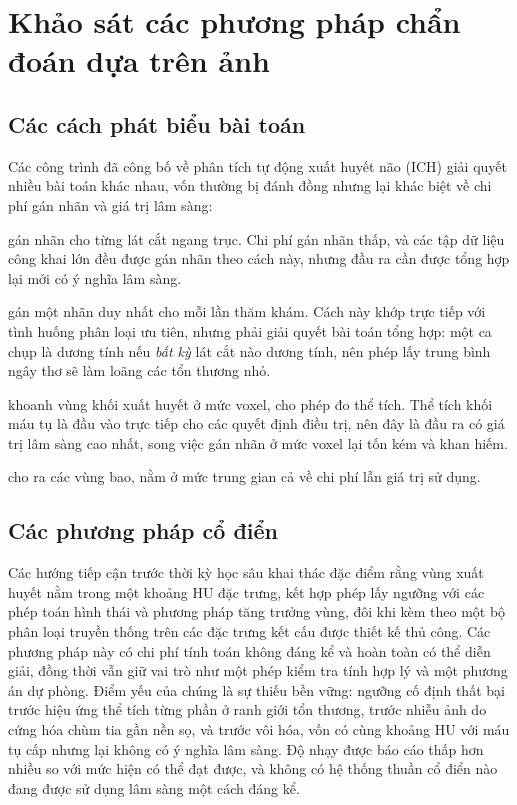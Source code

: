 \section{Khảo sát các phương pháp chẩn đoán dựa trên ảnh}
\label{sec:methods}

\subsection{Các cách phát biểu bài toán}

Các công trình đã công bố về phân tích tự động xuất huyết não (ICH) giải quyết
nhiều bài toán khác nhau, vốn thường bị đánh đồng nhưng lại khác biệt về chi phí
gán nhãn và giá trị lâm sàng:

\begin{description}[leftmargin=2.6cm,style=nextline]
    \item[Phân loại lát cắt] gán nhãn cho từng lát cắt ngang trục. Chi phí gán
          nhãn thấp, và các tập dữ liệu công khai lớn đều được gán nhãn theo cách
          này, nhưng đầu ra cần được tổng hợp lại mới có ý nghĩa lâm sàng.
    \item[Phân loại ca chụp] gán một nhãn duy nhất cho mỗi lần thăm khám. Cách
          này khớp trực tiếp với tình huống phân loại ưu tiên, nhưng phải giải
          quyết bài toán tổng hợp: một ca chụp là dương tính nếu \emph{bất kỳ}
          lát cắt nào dương tính, nên phép lấy trung bình ngây thơ sẽ làm loãng
          các tổn thương nhỏ.
    \item[Phân vùng] khoanh vùng khối xuất huyết ở mức voxel, cho phép đo thể
          tích. Thể tích khối máu tụ là đầu vào trực tiếp cho các quyết định điều
          trị, nên đây là đầu ra có giá trị lâm sàng cao nhất, song việc gán nhãn
          ở mức voxel lại tốn kém và khan hiếm.
    \item[Phát hiện / định vị] cho ra các vùng bao, nằm ở mức trung gian cả về
          chi phí lẫn giá trị sử dụng.
\end{description}

\subsection{Các phương pháp cổ điển}

Các hướng tiếp cận trước thời kỳ học sâu khai thác đặc điểm rằng vùng xuất huyết
nằm trong một khoảng HU đặc trưng, kết hợp phép lấy ngưỡng với các phép toán hình
thái và phương pháp tăng trưởng vùng, đôi khi kèm theo một bộ phân loại truyền
thống trên các đặc trưng kết cấu được thiết kế thủ công. Các phương pháp này có
chi phí tính toán không đáng kể và hoàn toàn có thể diễn giải, đồng thời vẫn giữ
vai trò như một phép kiểm tra tính hợp lý và một phương án dự phòng. Điểm yếu của
chúng là sự thiếu bền vững: ngưỡng cố định thất bại trước hiệu ứng thể tích từng
phần ở ranh giới tổn thương, trước nhiễu ảnh do cứng hóa chùm tia gần nền sọ, và
trước vôi hóa, vốn có cùng khoảng HU với máu tụ cấp nhưng lại không có ý nghĩa
lâm sàng. Độ nhạy được báo cáo thấp hơn nhiều so với mức hiện có thể đạt được, và
không có hệ thống thuần cổ điển nào đang được sử dụng lâm sàng một cách đáng kể.

